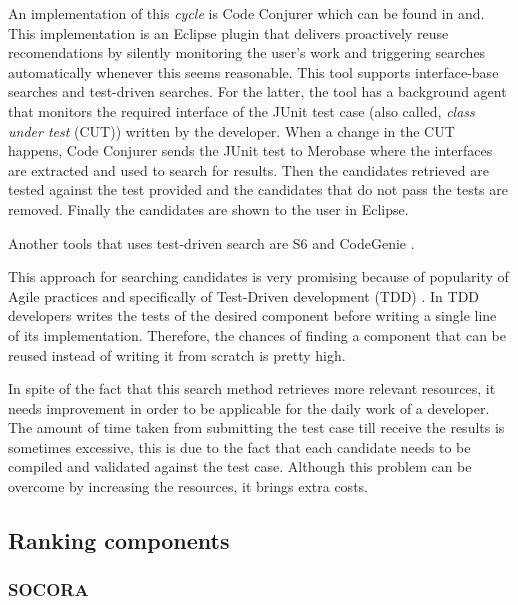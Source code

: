 An implementation of this \textit{cycle} is Code Conjurer which can be found in \cite{Hummel2008} and\cite{Hummel2013}. This implementation is an Eclipse plugin that delivers proactively reuse recomendations by silently monitoring the user's work and triggering searches automatically whenever this seems reasonable. This tool supports interface-base searches and test-driven searches. For the latter, the tool has a background agent that monitors the required interface of the JUnit test case (also called, \textit{class under test} (CUT)) written by the developer. When a change in the CUT happens, Code Conjurer sends the JUnit test to Merobase where the interfaces are extracted and used to search for results. Then the candidates retrieved are tested against the test provided and the candidates that do not pass the tests are removed. Finally the candidates are shown to the user in Eclipse.

Another tools that uses test-driven search are S6 \cite{Reiss2009} and CodeGenie \cite{Lemos2007}.

This approach for searching candidates is very promising because of popularity of Agile practices and specifically of Test-Driven development (TDD) \cite{Beck2003}. In TDD developers writes the tests of the desired component before writing a single line of its implementation. Therefore, the chances of finding a component that can be reused instead of writing it from scratch is pretty high.

In spite of the fact that this search method retrieves more relevant resources, it needs improvement in order to be applicable for the daily work of a developer. The amount of time taken from submitting the test case till receive the results is sometimes excessive, this is due to the fact that each candidate needs to be compiled and validated against the test case. Although this problem can be overcome by increasing the resources, it brings extra costs. 

\subsection{Ranking components}
\subsubsection{SOCORA}

